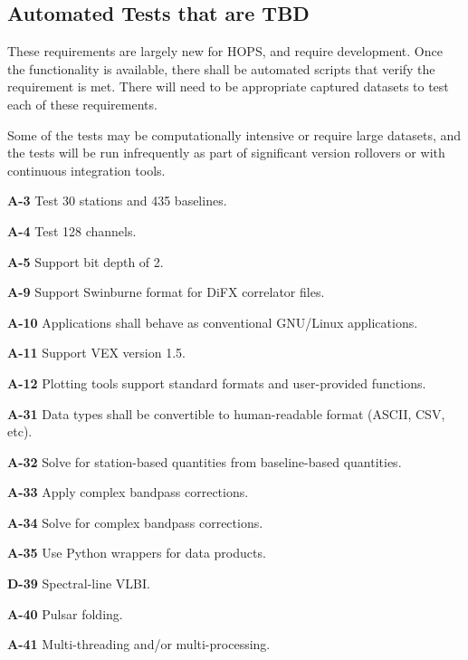 \subsection{Automated Tests that are TBD}
\label{sec:regress3}

These requirements are largely new for HOPS, and require development. Once the functionality is available, there shall be automated scripts that verify the requirement is met. There will need to be appropriate captured datasets to test each of these requirements.

Some of the tests may be computationally intensive or require large datasets, and the tests will be run infrequently as part of significant version rollovers or with continuous integration tools.

\begin{description}

\item{\textbf{A-3}} Test 30 stations and 435 baselines.
\item{\textbf{A-4}} Test 128 channels.
\item{\textbf{A-5}} Support bit depth of 2.

\item{\textbf{A-9}} Support Swinburne format for DiFX correlator files.
\item{\textbf{A-10}} Applications shall behave as conventional GNU/Linux applications.
\item{\textbf{A-11}} Support VEX version 1.5.
\item{\textbf{A-12}} Plotting tools support standard formats and user-provided functions.
  
  


\item{\textbf{A-31}} Data types shall be convertible to human-readable format (ASCII, CSV, etc).
\item{\textbf{A-32}} Solve for station-based quantities from baseline-based quantities.
\item{\textbf{A-33}} Apply complex bandpass corrections.
\item{\textbf{A-34}} Solve for complex bandpass corrections.
\item{\textbf{A-35}} Use Python wrappers for data products.

\item{\textbf{D-39}} Spectral-line VLBI.
\item{\textbf{A-40}} Pulsar folding.
\item{\textbf{A-41}} Multi-threading and/or multi-processing.

\end{description}


